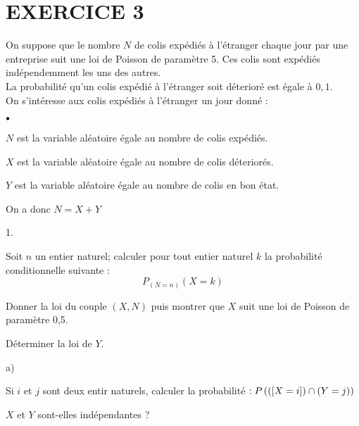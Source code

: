 \documentclass[11pt]{article}%
\begin{document}
\section*{EXERCICE 3}

On suppose que le nombre $N$ de colis expédiés à l'étranger chaque jour
par
une entreprise suit une loi de Poisson de paramètre 5. Ces colis sont
expédiés indépendemment les uns des autres.\\
La probabilité qu'un colis expédié à l'étranger soit déterioré est
égale à $0,1$.\\
On s'intéresse aux colis expédiés à l'étranger un jour donné :

\begin{noliste}{$\scriptstyle \bullet$}
\item $N$ est la variable aléatoire égale au nombre de colis expédiés.

\item $X$ est la variable aléatoire égale au nombre de colis
déteriorés.

\item $Y$ est la variable aléatoire égale au nombre de colis en bon
état.
\end{noliste}

\noindent On a donc $N = X + Y$

\begin{noliste}{1.}
 \setlength{\itemsep}{4mm}
\item Soit $n$ un entier naturel; calculer pour tout entier naturel $k$
la
probabilité conditionnelle suivante : 
\[
P_{\left( N = n\right) }\left( X = k\right)
\]

\item Donner la loi du couple $\left( X,N\right) $ puis montrer que $X$
suit
une loi de Poisson de paramètre 0,5.

\item Déterminer la loi de $Y$.

\item 

\begin{noliste}{a)}
 \setlength{\itemsep}{2mm}
\item Si $i$ et $j$ sont deux entir naturels, calculer la probabilité $
:P\left( \left(\left[ { X = i} \right]\right) \cap \left( Y = j\right) \right) $

\item $X$ et $Y$ sont-elles indépendantes ?
\end{noliste}
\end{noliste}
\end{document}
